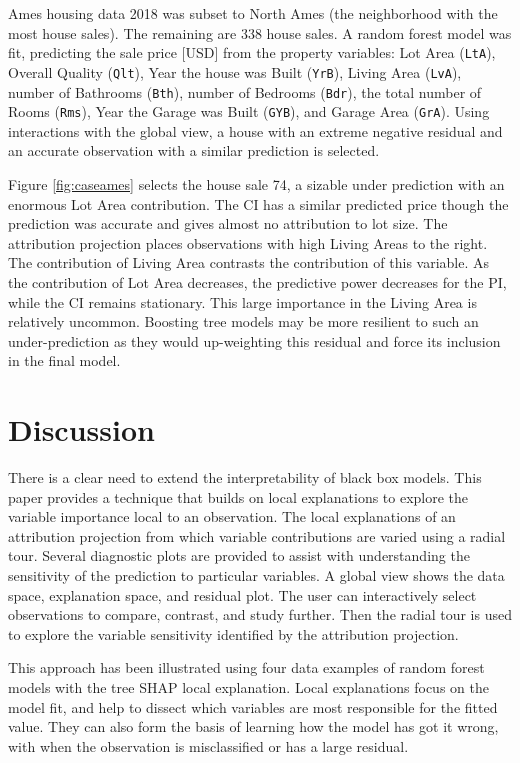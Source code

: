 \documentclass[
]{jss}
\begin{document}
Ames housing data 2018 \citep{de_cock_ames_2011, prevek18_ames_2018} was subset to North Ames (the neighborhood with the most house sales). The remaining are 338 house sales. A random forest model was fit, predicting the sale price {[}USD{]} from the property variables: Lot Area (\texttt{LtA}), Overall Quality (\texttt{Qlt}), Year the house was Built (\texttt{YrB}), Living Area (\texttt{LvA}), number of Bathrooms (\texttt{Bth}), number of Bedrooms (\texttt{Bdr}), the total number of Rooms (\texttt{Rms}), Year the Garage was Built (\texttt{GYB}), and Garage Area (\texttt{GrA}). Using interactions with the global view, a house with an extreme negative residual and an accurate observation with a similar prediction is selected.

Figure \ref{fig:caseames} selects the house sale 74, a sizable under prediction with an enormous Lot Area contribution. The CI has a similar predicted price though the prediction was accurate and gives almost no attribution to lot size. The attribution projection places observations with high Living Areas to the right. The contribution of Living Area contrasts the contribution of this variable. As the contribution of Lot Area decreases, the predictive power decreases for the PI, while the CI remains stationary. This large importance in the Living Area is relatively uncommon. Boosting tree models may be more resilient to such an under-prediction as they would up-weighting this residual and force its inclusion in the final model.

\hypertarget{sec:cheemdiscussion}{%
\section{Discussion}\label{sec:cheemdiscussion}}

There is a clear need to extend the interpretability of black box models. This paper provides a technique that builds on local explanations to explore the variable importance local to an observation. The local explanations of an attribution projection from which variable contributions are varied using a radial tour. Several diagnostic plots are provided to assist with understanding the sensitivity of the prediction to particular variables. A global view shows the data space, explanation space, and residual plot. The user can interactively select observations to compare, contrast, and study further. Then the radial tour is used to explore the variable sensitivity identified by the attribution projection.

This approach has been illustrated using four data examples of random forest models with the tree SHAP local explanation. Local explanations focus on the model fit, and help to dissect which variables are most responsible for the fitted value. They can also form the basis of learning how the model has got it wrong, with when the observation is misclassified or has a large residual.
\end{document}
